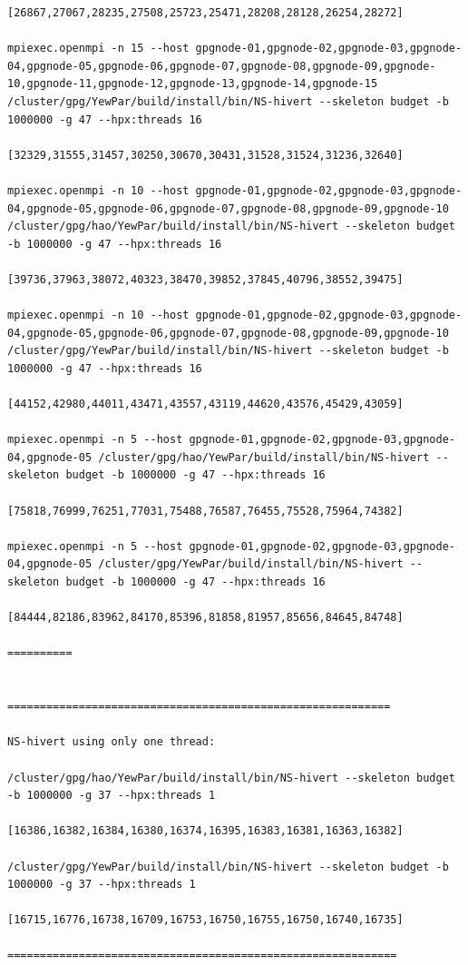 \documentclass{mproj}
\begin{document}
\begin{lstlisting}
[26867,27067,28235,27508,25723,25471,28208,28128,26254,28272]

mpiexec.openmpi -n 15 --host gpgnode-01,gpgnode-02,gpgnode-03,gpgnode-04,gpgnode-05,gpgnode-06,gpgnode-07,gpgnode-08,gpgnode-09,gpgnode-10,gpgnode-11,gpgnode-12,gpgnode-13,gpgnode-14,gpgnode-15 /cluster/gpg/YewPar/build/install/bin/NS-hivert --skeleton budget -b 1000000 -g 47 --hpx:threads 16

[32329,31555,31457,30250,30670,30431,31528,31524,31236,32640]

mpiexec.openmpi -n 10 --host gpgnode-01,gpgnode-02,gpgnode-03,gpgnode-04,gpgnode-05,gpgnode-06,gpgnode-07,gpgnode-08,gpgnode-09,gpgnode-10 /cluster/gpg/hao/YewPar/build/install/bin/NS-hivert --skeleton budget -b 1000000 -g 47 --hpx:threads 16

[39736,37963,38072,40323,38470,39852,37845,40796,38552,39475]

mpiexec.openmpi -n 10 --host gpgnode-01,gpgnode-02,gpgnode-03,gpgnode-04,gpgnode-05,gpgnode-06,gpgnode-07,gpgnode-08,gpgnode-09,gpgnode-10 /cluster/gpg/YewPar/build/install/bin/NS-hivert --skeleton budget -b 1000000 -g 47 --hpx:threads 16

[44152,42980,44011,43471,43557,43119,44620,43576,45429,43059]

mpiexec.openmpi -n 5 --host gpgnode-01,gpgnode-02,gpgnode-03,gpgnode-04,gpgnode-05 /cluster/gpg/hao/YewPar/build/install/bin/NS-hivert --skeleton budget -b 1000000 -g 47 --hpx:threads 16

[75818,76999,76251,77031,75488,76587,76455,75528,75964,74382]

mpiexec.openmpi -n 5 --host gpgnode-01,gpgnode-02,gpgnode-03,gpgnode-04,gpgnode-05 /cluster/gpg/YewPar/build/install/bin/NS-hivert --skeleton budget -b 1000000 -g 47 --hpx:threads 16

[84444,82186,83962,84170,85396,81858,81957,85656,84645,84748]

==========


===========================================================

NS-hivert using only one thread:

/cluster/gpg/hao/YewPar/build/install/bin/NS-hivert --skeleton budget -b 1000000 -g 37 --hpx:threads 1

[16386,16382,16384,16380,16374,16395,16383,16381,16363,16382]

/cluster/gpg/YewPar/build/install/bin/NS-hivert --skeleton budget -b 1000000 -g 37 --hpx:threads 1

[16715,16776,16738,16709,16753,16750,16755,16750,16740,16735]

============================================================

\end{lstlisting}






\end{document}
